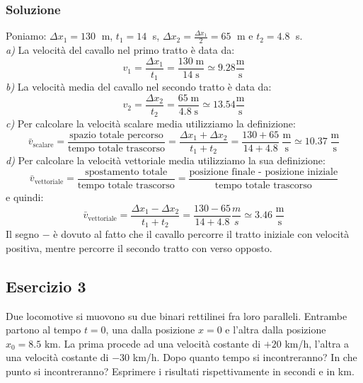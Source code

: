 \documentclass[12pt,a4paper]{book}
\begin{document}
\subsubsection*{Soluzione}
Poniamo: $\Delta x_1 = 130 \;$ m, $t_1 = 14 \;$ s, $\Delta x_2 = \frac{\Delta x_1}{2}= 65 \;$ m e $t_2 = 4.8 \;$ s. \\
\emph{a)} La velocità del cavallo nel primo tratto è data da:
\begin{equation*}
v_1=\frac{\Delta x_1}{t_1}= \frac{130 \; \text{m}}{14 \; \text{s}} \simeq 9.28 \frac{\text{m}}{\text{s}} 
\end{equation*}
\emph{b)} La velocità media del cavallo nel secondo tratto è data da:
\begin{equation*}
v_2=\frac{\Delta x_2}{t_2}= \frac{65 \; \text{m}}{4.8 \; \text{s}} \simeq 13.54 \frac{\text{m}}{\text{s}} 
\end{equation*}
\emph{c)} Per calcolare la velocità scalare media utilizziamo la definizione:
\begin{equation*}
\bar{v}_{\text{scalare}}=\frac{\text{spazio  totale percorso}}{\text{tempo totale trascorso}}=\frac{\Delta x_1 + \Delta x_2}{t_1 + t_2}= \frac{130 + 65}{14 + 4.8} \: \frac{\text{m}}{\text{s}}\simeq 10.37 \; \frac{\text{m}}{\text{s}}
\end{equation*}
\emph{d)} Per calcolare la velocità vettoriale media utilizziamo la sua definizione:
\begin{equation*}
\bar{v}_{\text{vettoriale}}=\frac{\text{spostamento totale}}{\text{tempo  totale  trascorso}}= \frac{\text{posizione  finale - posizione iniziale}}{\text{tempo  totale  trascorso}}	
\end{equation*}
e quindi:
\begin{equation*}
\bar{v}_{\text{vettoriale}}=\frac{\Delta x_1 - \Delta x_2}{t_1 + t_2}= \frac{130 - 65}{14 + 4.8}\frac{m}{s}\simeq 3.46 \; \frac{\text{m}}{\text{s}} 
\end{equation*}
Il segno $-$ è dovuto al fatto che il cavallo percorre il tratto iniziale
con velocità positiva, mentre percorre il secondo tratto con verso opposto.\\


\subsection*{Esercizio 3}
Due locomotive si muovono su due binari rettilinei fra loro paralleli. Entrambe partono al tempo $t=0$, una dalla posizione $x=0$ e l’altra dalla posizione $x_0=8.5$ km. La prima procede ad una velocità costante di $+20$ km/h, l’altra a una velocità costante di $-30$ km/h. Dopo quanto tempo si incontreranno? In che punto si incontreranno? Esprimere i risultati rispettivamente in secondi e in km.
\end{document}
